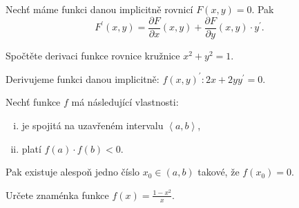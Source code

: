 \begin{veta}\label{implfce}
Nechť máme funkci danou implicitně rovnicí $F(x,y)=0$. Pak
$$F^\prime (x,y)=\frac{\partial F}{\partial x}(x, y) + \frac{\partial F}{\partial y}(x, y)\cdot y^\prime.$$
\end{veta}

\begin{priklad}
  Spočtěte derivaci funkce rovnice kružnice $x^2+y^2=1.$
\end{priklad}

\begin{reseni}
  Derivujeme funkci danou implicitně: $f(x,y)^\prime\colon 2x+2yy^\prime=0.$
\end{reseni}

\begin{veta}
Nechť funkce $f$ má následující vlastnosti:
\begin{enumerate}[i.]
\item je spojitá na uzavřeném intervalu $\left<  a,b \right> $,
\item platí $f(a)\cdot f(b)<0$.
\end{enumerate}
Pak existuje alespoň jedno číslo $x_0\in (a,b)$ takové, že $f(x_0)=0$.
\end{veta}

\begin{priklad}
  Určete znaménka funkce $f(x)=\frac{1-x^2}{x}.$
\end{priklad}

